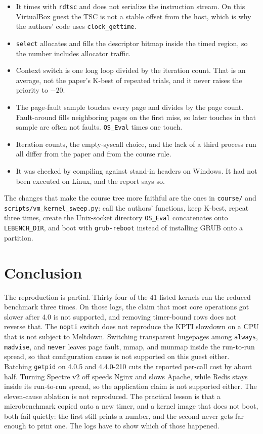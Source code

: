 \documentclass[11pt]{article}
\begin{document}
\begin{itemize}
\item It times with \texttt{rdtsc} and does not serialize the instruction stream. On this VirtualBox guest the TSC is not a stable offset from the host, which is why the authors' code uses \texttt{clock\_gettime}.
\item \texttt{select} allocates and fills the descriptor bitmap inside the timed region, so the number includes allocator traffic.
\item Context switch is one long loop divided by the iteration count. That is an average, not the paper's K-best of repeated trials, and it never raises the priority to $-20$.
\item The page-fault sample touches every page and divides by the page count. Fault-around fills neighboring pages on the first miss, so later touches in that sample are often not faults. \texttt{OS\_Eval} times one touch.
\item Iteration counts, the empty-syscall choice, and the lack of a third process run all differ from the paper and from the course rule.
\item It was checked by compiling against stand-in headers on Windows. It had not been executed on Linux, and the report says so.
\end{itemize}

The changes that make the course tree more faithful are the ones in \texttt{course/} and \texttt{scripts/vm\_kernel\_sweep.py}: call the authors' functions, keep K-best, repeat three times, create the Unix-socket directory \texttt{OS\_Eval} concatenates onto \texttt{LEBENCH\_DIR}, and boot with \texttt{grub-reboot} instead of installing GRUB onto a partition.

\section{Conclusion}

The reproduction is partial. Thirty-four of the 41 listed kernels ran the reduced benchmark three times. On those logs, the claim that most core operations got slower after 4.0 is not supported, and removing timer-bound rows does not reverse that. The \texttt{nopti} switch does not reproduce the KPTI slowdown on a CPU that is not subject to Meltdown. Switching transparent hugepages among \texttt{always}, \texttt{madvise}, and \texttt{never} leaves page fault, mmap, and munmap inside the run-to-run spread, so that configuration cause is not supported on this guest either. Batching \texttt{getpid} on 4.0.5 and 4.4.0-210 cuts the reported per-call cost by about half. Turning Spectre v2 off speeds Nginx and slows Apache, while Redis stays inside its run-to-run spread, so the application claim is not supported either. The eleven-cause ablation is not reproduced. The practical lesson is that a microbenchmark copied onto a new timer, and a kernel image that does not boot, both fail quietly: the first still prints a number, and the second never gets far enough to print one. The logs have to show which of those happened.
\end{document}
